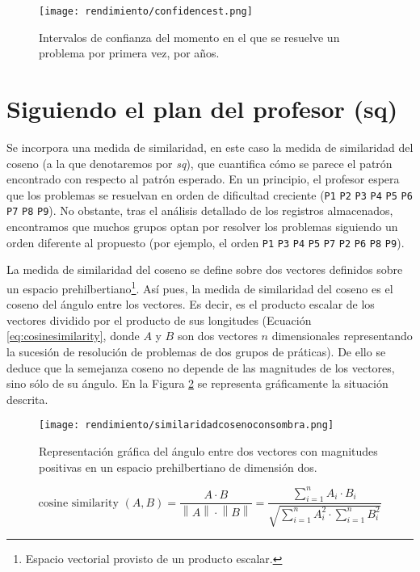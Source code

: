 \begin{figure}[H]
    \centering
    \texttt{[image: rendimiento/confidencest.png]}
    \caption{Intervalos de confianza del momento en el que se resuelve un problema por primera vez, por años.}
    \label{fig:confidenceearlybird}
\end{figure}

\section{Siguiendo el plan del profesor (sq)}

Se incorpora una medida de similaridad, en este caso la medida de similaridad del coseno (a la que denotaremos por \emph{sq}), que cuantifica cómo se parece el patrón encontrado con respecto al patrón esperado. En un principio, el profesor espera que los problemas se resuelvan en orden de dificultad creciente (\texttt{P1} \texttt{P2} \texttt{P3} \texttt{P4} \texttt{P5} \texttt{P6} \texttt{P7} \texttt{P8} \texttt{P9}). No obstante, tras el análisis detallado de los registros almacenados, encontramos que muchos grupos optan por resolver los problemas siguiendo un orden diferente al propuesto (por ejemplo, el orden \texttt{P1} \texttt{P3} \texttt{P4} \texttt{P5} \texttt{P7} \texttt{P2} \texttt{P6} \texttt{P8} \texttt{P9}).

La medida de similaridad del coseno se define sobre dos vectores definidos sobre un espacio prehilbertiano\footnote{Espacio vectorial provisto de un producto escalar.}. Así pues, la medida de similaridad del coseno es el coseno del ángulo entre los vectores. Es decir, es el producto escalar de los vectores dividido por el producto de sus longitudes (Ecuación \ref{eq:cosinesimilarity}, donde $A$ y $B$ son dos vectores $n$ dimensionales representando la sucesión de resolución de problemas de dos grupos de práticas). De ello se deduce que la semejanza coseno no depende de las magnitudes de los vectores, sino sólo de su ángulo. En la Figura \ref{fig:cosinesimilarity} se representa gráficamente la situación descrita.

\begin{figure}[H]
    \centering
    \texttt{[image: rendimiento/similaridadcosenoconsombra.png]}
    \caption{Representación gráfica del ángulo entre dos vectores con magnitudes positivas en un espacio prehilbertiano de dimensión dos.}
    \label{fig:cosinesimilarity}
\end{figure}

\begin{equation}
\text{cosine similarity }(A,B) = \frac{A\cdot B}{\left\lVert A \right\rVert \cdot \left\lVert B \right\rVert} = \frac{\sum_{i=1}^n {A_i \cdot B_i}}{\sqrt{\sum_{i=1}^n{A_i^2} \cdot \sum_{i=1}^n {B_i^2}}}
\label{eq:cosinesimilarity}
\end{equation}

